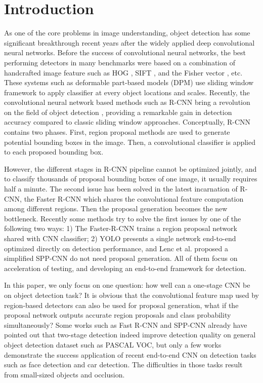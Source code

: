  
\section{Introduction}

As one of the core problems in image understanding, object detection has some significant breakthrough recent years after the widely applied deep convolutional neural networks. Before the success of convolutional neural networks, the best performing detectors in many benchmarks were based on a combination of handcrafted image feature such as HOG\cite{dalal2005histograms} , SIFT\cite{lowe2004distinctive} , and the Fisher vector\cite{cinbis2013segmentation} , etc. These systems such as deformable part-based models (DPM)\cite{felzenszwalb2010object} use sliding window framework to apply classifier at every object locations and scales. Recently, the convolutional neural network based methods such as R-CNN\cite{girshick2014rich,girshick2015fast} bring a revolution on the field of object detection , providing a remarkable gain in detection accuracy compared to classic sliding window approaches. Conceptually, R-CNN contains two phases. First, region proposal methods are used to generate potential bounding boxes in the image. Then, a convolutional classifier is applied to each proposed bounding box. 

However, the different stages in R-CNN pipeline cannot be optimized jointly, and to classify thousands of proposal bounding boxes of one image, it usually requires half a minute. The second issue has been solved in the latest incarnation of R-CNN, the Faster R-CNN\cite{ren2015faster} which shares the convolutional feature computation among different regions. Then the proposal generation becomes the new bottleneck. Recently some methods try to solve the first issues by one of the following two ways: 1) The Faster-R-CNN trains a region proposal network shared with CNN classifier; 2) YOLO\cite{YOLO}  presents a single network end-to-end optimized directly on detection performance, and Lenc et al.\cite{LencV15} proposed a simplified SPP-CNN do not need proposal generation. All of them focus on acceleration of testing, and developing an end-to-end framework for detection. 

In this paper, we only focus on one question: how well can a one-stage CNN be on object detection task? It is obvious that the convolutional feature map used by region-based detectors can also be used for proposal generation, what if the proposal network outputs accurate region proposals and class probability simultaneously? Some works such as Fast R-CNN and SPP-CNN already have pointed out that two-stage detection indeed improve detection quality on general object detection dataset such as PASCAL VOC, but only a few works\cite{farfade2015multi} demonstrate the success application of recent end-to-end CNN on detection tasks such as face detection and car detection. The difficulties in those tasks result from small-sized objects and occlusion. 

